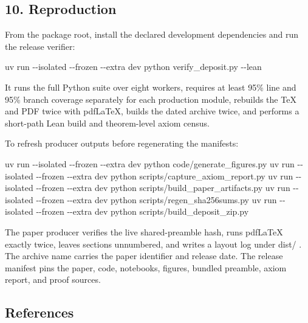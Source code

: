 \documentclass[
  11pt,
]{article}
\newenvironment{Shaded}{\begin{snugshade}}{\end{snugshade}}
\newcommand{\NormalTok}[1]{#1}
\theoremstyle{plain}
\theoremstyle{definition}\newtheorem{definition}[theorem]{Definition}
\theoremstyle{remark}\newtheorem*{remark}{Remark}
\DeclareRobustCommand{\texttt}[1]{%
  \ifmmode
    \mathtt{#1}%
  \else
    {\ttfamily\small\renewcommand{\_}{\symbol{95}\allowbreak}#1}%
  \fi}
\begin{document}
\subsection{10. Reproduction}\label{reproduction}

From the package root, install the declared development dependencies and run
the release verifier:

\begin{Shaded}
\begin{Highlighting}[]
\NormalTok{uv run {-}{-}isolated {-}{-}frozen {-}{-}extra dev python verify\_deposit.py {-}{-}lean}
\end{Highlighting}
\end{Shaded}

It runs the full Python suite over eight workers, requires at least 95\% line
and 95\% branch coverage separately for each production module, rebuilds the
TeX and PDF twice with pdfLaTeX, builds the dated archive twice, and performs a
short-path Lean build and theorem-level axiom census.

To refresh producer outputs before regenerating the manifests:

\begin{Shaded}
\begin{Highlighting}[]
\NormalTok{uv run {-}{-}isolated {-}{-}frozen {-}{-}extra dev python code/generate\_figures.py}
\NormalTok{uv run {-}{-}isolated {-}{-}frozen {-}{-}extra dev python scripts/capture\_axiom\_report.py}
\NormalTok{uv run {-}{-}isolated {-}{-}frozen {-}{-}extra dev python scripts/build\_paper\_artifacts.py}
\NormalTok{uv run {-}{-}isolated {-}{-}frozen {-}{-}extra dev python scripts/regen\_sha256sums.py}
\NormalTok{uv run {-}{-}isolated {-}{-}frozen {-}{-}extra dev python scripts/build\_deposit\_zip.py}
\end{Highlighting}
\end{Shaded}

The paper producer verifies the live shared-preamble hash, runs pdfLaTeX
exactly twice, leaves sections unnumbered, and writes a layout log under
\texttt{dist/}. The archive name carries the paper identifier and release date. The
release manifest pins the paper, code, notebooks, figures, bundled preamble,
axiom report, and proof sources.

\subsection{References}\label{references}
\end{document}
